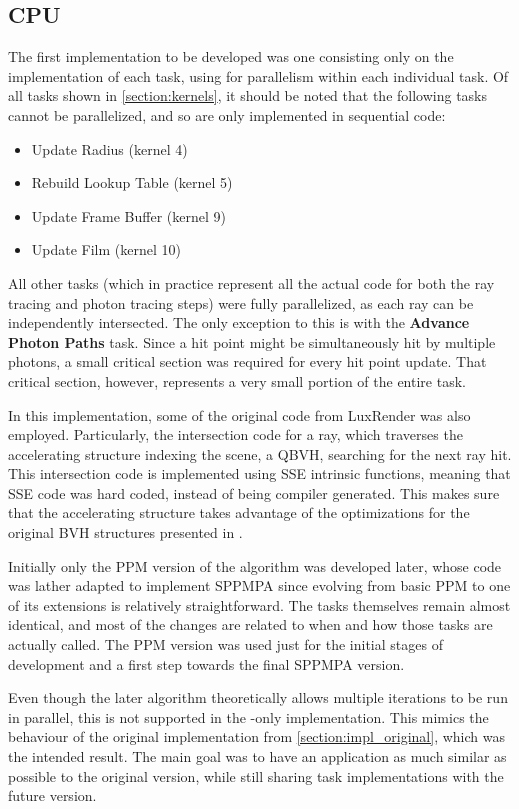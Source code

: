 \documentclass[main.tex]{subfiles}
\begin{document}
\subsection{CPU} \label{section:impl_cpu}

The first implementation to be developed was one consisting only on the implementation of each task, using \openmp for parallelism within each individual task. Of all tasks shown in \cref{section:kernels}, it should be noted that the following tasks cannot be parallelized, and so are only implemented in sequential code:
\begin{itemize}
  \item Update Radius (kernel 4)
  \item Rebuild Lookup Table (kernel 5)
  \item Update Frame Buffer (kernel 9)
  \item Update Film (kernel 10)
\end{itemize}

All other tasks (which in practice represent all the actual code for both the ray tracing and photon tracing steps) were fully parallelized, as each ray can be independently intersected. The only exception to this is with the \textbf{Advance Photon Paths} task. Since a hit point might be simultaneously hit by multiple photons, a small critical section was required for every hit point update. That critical section, however, represents a very small portion of the entire task.

In this implementation, some of the original code from LuxRender was also employed. Particularly, the intersection code for a ray, which traverses the accelerating structure indexing the scene, a \acf{QBVH}, searching for the next ray hit.
This intersection code is implemented using SSE intrinsic functions, meaning that SSE code was hard coded, instead of being compiler generated. This makes sure that the accelerating structure takes advantage of the optimizations for the original \acs{BVH} structures presented in \cite{dammertz2008shallow}.


Initially only the PPM version of the algorithm was developed later, whose code was lather adapted to implement SPPMPA since evolving from basic PPM to one of its extensions is relatively straightforward. The tasks themselves remain almost identical, and most of the changes are related to when and how those tasks are actually called. The PPM version was used just for the initial stages of development and a first step towards the final SPPMPA version.

Even though the later algorithm theoretically allows multiple iterations to be run in parallel, this is not supported in the \cpu-only implementation. This mimics the behaviour of the original implementation from \cref{section:impl_original}, which was the intended result. The main goal was to have an application as much similar as possible to the original \cpu version, while still sharing task implementations with the future \starpu version.
\end{document}
